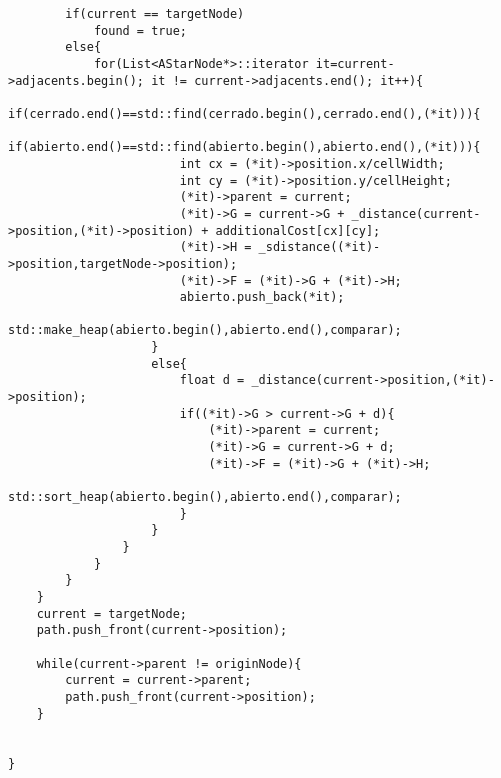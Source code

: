 \begin{verbatim}
        if(current == targetNode)
            found = true;
        else{
            for(List<AStarNode*>::iterator it=current->adjacents.begin(); it != current->adjacents.end(); it++){
                if(cerrado.end()==std::find(cerrado.begin(),cerrado.end(),(*it))){
                    if(abierto.end()==std::find(abierto.begin(),abierto.end(),(*it))){
                        int cx = (*it)->position.x/cellWidth;
                        int cy = (*it)->position.y/cellHeight;
                        (*it)->parent = current;
                        (*it)->G = current->G + _distance(current->position,(*it)->position) + additionalCost[cx][cy];
                        (*it)->H = _sdistance((*it)->position,targetNode->position);
                        (*it)->F = (*it)->G + (*it)->H;
                        abierto.push_back(*it);
                        std::make_heap(abierto.begin(),abierto.end(),comparar);
                    }
                    else{
                        float d = _distance(current->position,(*it)->position);
                        if((*it)->G > current->G + d){
                            (*it)->parent = current;
                            (*it)->G = current->G + d;
                            (*it)->F = (*it)->G + (*it)->H;
                            std::sort_heap(abierto.begin(),abierto.end(),comparar);
                        }
                    }
                }
            }
        }
    }
    current = targetNode;
    path.push_front(current->position);

    while(current->parent != originNode){
        current = current->parent;
        path.push_front(current->position);
    }


}


\end{verbatim}

